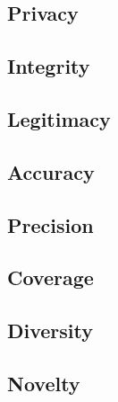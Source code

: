 \subsection{Privacy}
\subsection{Integrity}
\subsection{Legitimacy}

\subsection{Accuracy}
\subsection{Precision}
\subsection{Coverage}
\subsection{Diversity}
\subsection{Novelty}



